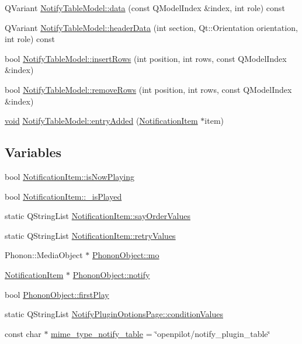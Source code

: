\begin{DoxyCompactItemize}
\-Q\-Variant \hyperlink{group___notify_plugin_gacf622323e5cab0f1ecdeb6d35e4b8039}{\-Notify\-Table\-Model\-::data} (const \-Q\-Model\-Index \&index, int role) const 
\item 
\-Q\-Variant \hyperlink{group___notify_plugin_gab211bb28323ebcede08ef838bc6b2789}{\-Notify\-Table\-Model\-::header\-Data} (int section, \-Qt\-::\-Orientation orientation, int role) const 
\item 
bool \hyperlink{group___notify_plugin_ga989fe66cec593e3ae8a3715160d4db33}{\-Notify\-Table\-Model\-::insert\-Rows} (int position, int rows, const \-Q\-Model\-Index \&index)
\item 
bool \hyperlink{group___notify_plugin_ga3e038f81c56a42999341a5704f703dd3}{\-Notify\-Table\-Model\-::remove\-Rows} (int position, int rows, const \-Q\-Model\-Index \&index)
\item 
\hyperlink{group___u_a_v_objects_plugin_ga444cf2ff3f0ecbe028adce838d373f5c}{void} \hyperlink{group___notify_plugin_gaa28f89364ed3f06a9e1ab36b51216b65}{\-Notify\-Table\-Model\-::entry\-Added} (\hyperlink{class_notification_item}{\-Notification\-Item} $\ast$item)
\end{DoxyCompactItemize}
\subsection*{\-Variables}
\begin{DoxyCompactItemize}
\item 
bool \hyperlink{group___notify_plugin_gabd9ee81e318805b60e89e7045eb7deaa}{\-Notification\-Item\-::is\-Now\-Playing}
\item 
bool \hyperlink{group___notify_plugin_ga6469ec28d3051122de855c266d0dc6dd}{\-Notification\-Item\-::\-\_\-is\-Played}
\item 
static \-Q\-String\-List \hyperlink{group___notify_plugin_ga856cd4e9d78e6c8900f9de74f0f25dac}{\-Notification\-Item\-::say\-Order\-Values}
\item 
static \-Q\-String\-List \hyperlink{group___notify_plugin_ga7c47e100b3ea3f8b527dbdea2385edd0}{\-Notification\-Item\-::retry\-Values}
\item 
\-Phonon\-::\-Media\-Object $\ast$ \hyperlink{group___notify_plugin_ga3b35d975a7599cd263b275559734e54d}{\-Phonon\-Object\-::mo}
\item 
\hyperlink{class_notification_item}{\-Notification\-Item} $\ast$ \hyperlink{group___notify_plugin_ga82a15e7062562dabd14047b2e5398889}{\-Phonon\-Object\-::notify}
\item 
bool \hyperlink{group___notify_plugin_ga86b5c4ceede5297e656149cd1f1af3fe}{\-Phonon\-Object\-::first\-Play}
\item 
static \-Q\-String\-List \hyperlink{group___notify_plugin_ga9823971d5ab6a1e6f68073d8553a7414}{\-Notify\-Plugin\-Options\-Page\-::condition\-Values}
\item 
const char $\ast$ \hyperlink{group___notify_plugin_ga326ccffe8d16a6f14d44c2048dea58a7}{mime\-\_\-type\-\_\-notify\-\_\-table} = \char`\"{}openpilot/notify\-\_\-plugin\-\_\-table\char`\"{}
\end{DoxyCompactItemize}
